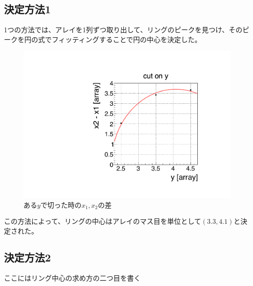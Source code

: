 \documentclass[uplatex, titlepage, dvipdfmx, 12pt, a4paper]{jsreport}
\begin{document}
    \subsection{決定方法1}
      1つの方法では、アレイを1列ずつ取り出して、リングのピークを見つけ、そのピークを円の式でフィッティングすることで円の中心を決定した。
      \begin{figure}[h]
        \begin{center} 
          \includegraphics[scale=0.5, clip]{image/find_center.pdf}
          \caption{ある$y$で切った時の$x_1,x_2$の差} 
          \label{fig:find_center1} 
        \end{center}
      \end{figure}
      この方法によって、リングの中心はアレイのマス目を単位として$\left(3.3, 4.1\right)$と決定された。
    \subsection{決定方法2}
      ここにはリング中心の求め方の二つ目を書く
\end{document}
